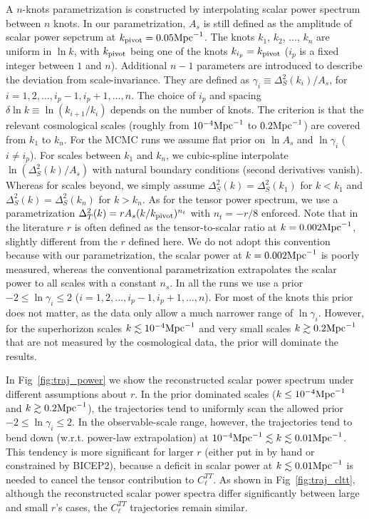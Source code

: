 \documentclass[11pt]{article}
\begin{document}
A $n$-knots parametrization is constructed by interpolating scalar power spectrum between $n$ knots. In our parametrization,  $A_s$ is still defined as the amplitude of scalar power sepctrum at $k_{\rm pivot}=0.05 {\rm Mpc}^{-1}$. The knots $k_1$, $k_2$, ..., $k_n$ are uniform in $\ln k$, with $k_{\rm pivot}$ being one of the knots $k_{i_p} = k_{\rm pivot}$ ($i_p$ is a fixed integer between $1$ and $n$). Additional $n-1$ parameters are introduced to describe the deviation from scale-invariance. They are defined as $\gamma_i\equiv \Delta^2_S(k_i)/ A_s$, for $i = 1, 2, \ldots, i_p - 1, i_p+1, \ldots, n$.  The choice of $i_p$ and spacing $\delta\ln k \equiv \ln (k_{i+1}/k_i)$ depends on the number of knots. The criterion is that the relevant cosmological scales (roughly from $10^{-4}{\rm Mpc}^{-1}$ to $0.2 {\rm Mpc}^{-1}$) are covered from $k_1$ to $k_n$. For the MCMC runs we assume flat prior on $\ln A_s$ and $\ln \gamma_i$ ($i\neq i_p$). For scales between $k_1$ and $k_n$, we cubic-spline interpolate $\ln (\Delta^2_S(k)/A_s)$ with natural boundary conditions (second derivatives vanish). Whereas for scales beyond, we simply assume $\Delta^2_S(k) = \Delta^2_S(k_1)$ for $k<k_1$ and $\Delta^2_S(k) = \Delta^2_S(k_n)$ for $k>k_n$. As for the tensor power spectrum, we use a parametrization $\Delta^2_T(k) = r A_s (k/k_{\rm pivot})^{n_t}$ with $n_t = -r/8$ enforced. Note that in the literature $r$ is often defined as the tensor-to-scalar ratio at $k=0.002 {\rm Mpc}^{-1}$, slightly different from the $r$ defined here. We do not adopt this convention because with our parametrization, the scalar power at $k=0.002 {\rm Mpc}^{-1}$ is poorly measured, whereas the conventional parametrization extrapolates the scalar power to all scales with a constant $n_s$. In all the runs we use a prior $-2 \le \ln \gamma_i \le 2$ ($i = 1, 2, \ldots, i_p - 1, i_p+1, \ldots, n$). For most of the knots this prior does not matter, as the data only allow a much narrower range of $\ln \gamma_i$. However, for the superhorizon scales $k\lesssim 10^{-4} {\rm Mpc}^{-1}$ and very small scales $k\gtrsim 0.2 {\rm Mpc}^{-1}$ that are not measured by the cosmological data, the prior will dominate the results. 

In Fig~\ref{fig:traj_power} we show the reconstructed scalar power spectrum under different assumptions about $r$. In the prior dominated scales ($k\le 10^{-4} {\rm Mpc}^{-1}$ and $k\gtrsim 0.2 {\rm Mpc}^{-1}$), the trajectories tend to uniformly scan the allowed prior $-2\le \ln \gamma_i\le 2$. In the observable-scale range, however, the trajectories tend to bend down (w.r.t. power-law extrapolation) at $10^{-4} {\rm Mpc}^{-1} \lesssim k \lesssim 0.01 {\rm Mpc}^{-1}$. This tendency is more significant for larger $r$ (either put in by hand or constrained by BICEP2), because a deficit in scalar power at $k\lesssim 0.01 {\rm Mpc}^{-1}$ is needed to cancel the tensor contribution to $C_\ell^{TT}$. As shown in Fig~\ref{fig:traj_cltt},  although the reconstructed scalar power spectra differ significantly between large and small $r$'s cases, the $C_\ell^{TT}$ trajectories remain similar.
\end{document}
